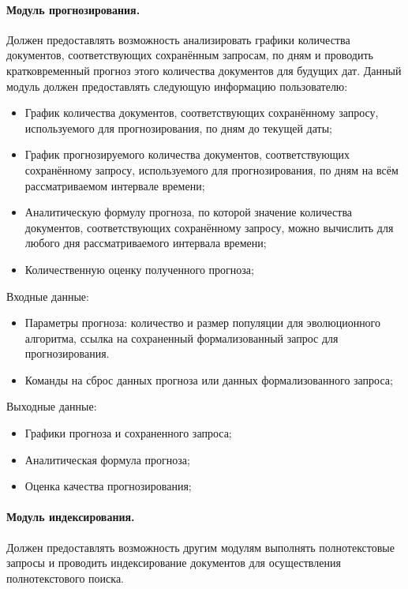 \paragraph{Модуль прогнозирования.}

Должен предоставлять возможность анализировать графики количества документов, соответствующих сохранённым запросам, по дням и проводить кратковременный прогноз этого количества документов для будущих дат. Данный модуль должен предоставлять следующую информацию пользователю:
\begin{itemize}
\item График количества документов, соответствующих сохранённому запросу, используемого для прогнозирования, по дням до текущей даты;
\item График прогнозируемого количества документов, соответствующих сохранённому запросу, используемого для прогнозирования, по дням на всём рассматриваемом интервале времени;
\item Аналитическую формулу прогноза, по которой значение количества документов, соответствующих сохранённому запросу, можно вычислить для любого дня рассматриваемого интервала времени;
\item Количественную оценку полученного прогноза;
\end{itemize}

Входные данные:
\begin{itemize}
\item Параметры прогноза: количество и размер популяции для эволюционного алгоритма, ссылка на сохраненный формализованный запрос для прогнозирования.
\item Команды на сброс данных прогноза или данных формализованного запроса;
\end{itemize}

Выходные данные:
\begin{itemize}
\item Графики прогноза и сохраненного запроса;
\item Аналитическая формула прогноза;
\item Оценка качества прогнозирования;
\end{itemize}

\paragraph{Модуль индексирования.}
Должен предоставлять возможность другим модулям выполнять полнотекстовые запросы и проводить индексирование документов для осуществления полнотекстового поиска.

